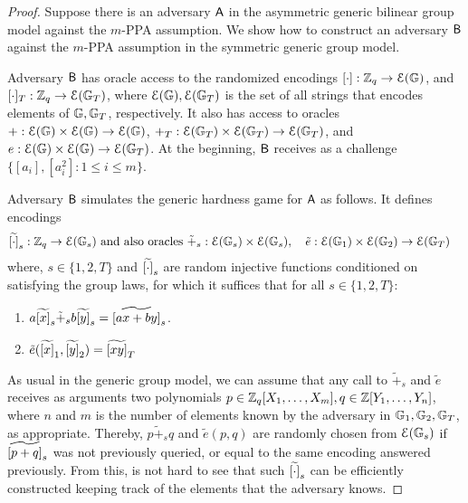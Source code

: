 \begin{proof}
Suppose there is an adversary $\mathsf{A}$  in the asymmetric generic bilinear group model against the $m$-PPA assumption.  We show how to construct an adversary $\mathsf{B}$ against the  $m$-PPA assumption in the symmetric generic group model. 


Adversary $\mathsf{B}$ has oracle access to the randomized encodings $[\cdot]: \mathbb{Z}_q \to \mathcal{E}(\mathbb{G})$, 
and $[\cdot]_T: \mathbb{Z}_q \to \mathcal{E}(\mathbb{G}_T)$, where $\mathcal{E}(\mathbb{G}),\mathcal{E}(\mathbb{G}_T)$ is the set of all strings that encodes elements of $\mathbb{G},\mathbb{G}_T$, respectively. It also has access to oracles $+ : \mathcal{E}(\mathbb{G})\times \mathcal{E}(\mathbb{G}) \to \mathcal{E}(\mathbb{G})$, $+_T: \mathcal{E}(\mathbb{G}_T)\times \mathcal{E}(\mathbb{G}_T) \to \mathcal{E}(\mathbb{G}_T)$, and $e:\mathcal{E}(\mathbb{G})\times\mathcal{E}(\mathbb{G})\to\mathcal{E}(\mathbb{G}_T)$. At the beginning, $\mathsf{B}$ receives as a challenge $\{ [a_{i}],[a_i^2]:1\leq i \leq m\}$.

Adversary $\mathsf{B}$ simulates the generic hardness game for $\mathsf{A}$ as follows. It defines encodings  
\begin{align*}
	&\widetilde{[\cdot]}_s: \mathbb{Z}_q \to \mathcal{E}(\mathbb{G}_s)  \text{ and also oracles }
	\tilde{+}_s : \mathcal{E}(\mathbb{G}_s)\times\mathcal{E}(\mathbb{G}_s),\quad \tilde{e}:\mathcal{E}(\mathbb{G}_1)\times\mathcal{E}(\mathbb{G}_2)\to\mathcal{E}(\mathbb{G}_T)
\end{align*}
where, $s\in\{1,2,T\}$ and $\widetilde{[\cdot]}_s$ are random injective functions conditioned on satisfying the group laws, for which it suffices that for all $s\in\{1,2,T\}$:
\begin{enumerate}
\item $a\widetilde{[x]}_s\tilde{+}_s b\widetilde{[y]}_s = \widetilde{[ax+by]}_s$.
\item $\tilde{e}(\widetilde{[x]}_1,\widetilde{[y]}_2)=\widetilde{[xy]}_T$
\end{enumerate}
As usual in the generic group model, we can assume that any call to $\tilde{+}_s$ and $\tilde{e}$ receives as arguments two polynomials $p\in\mathbb{Z}_q[X_1,\ldots,X_m], q\in\mathbb{Z}[Y_1,\ldots,Y_n]$, where $n$ and $m$ is the number of elements known by the adversary in $\mathbb{G}_1,\mathbb{G}_2,\mathbb{G}_T$, as appropriate. Thereby, $p\tilde{+}_s q$ and $\tilde{e}(p,q)$ are randomly chosen from $\mathcal{E}(\mathbb{G}_s)$ if $\widetilde{[p+q]}_s$ was not previously queried, or equal to the same encoding answered previously. From this, is not hard to see that such $\widetilde{[\cdot]}_s$ can be efficiently constructed keeping track of the elements that the adversary knows. 


\end{proof}
